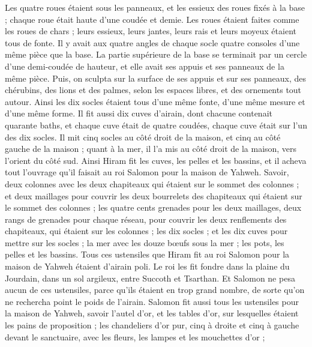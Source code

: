 \begin{multicols}{2}
Les quatre roues étaient sous les panneaux, et les essieux des roues fixés à la base ; chaque roue était haute d'une coudée et demie.
Les roues étaient faites comme les roues de chars ; leurs essieux, leurs jantes, leurs rais et leurs moyeux étaient tous de fonte.
Il y avait aux quatre angles de chaque socle quatre consoles d’une même pièce que la base.
La partie supérieure de la base se terminait par un cercle d’une demi-coudée de hauteur, et elle avait ses appuis et ses panneaux de la même pièce.
Puis, on sculpta sur la surface de ses appuis et sur ses panneaux, des chérubins, des lions et des palmes, selon les espaces libres, et des ornements tout autour.
Ainsi les dix socles étaient tous d’une même fonte, d’une même mesure et d’une même forme.
Il fit aussi dix cuves d'airain, dont chacune contenait quarante baths, et chaque cuve était de quatre coudées, chaque cuve était sur l’un des dix socles.
Il mit cinq socles au côté droit de la maison, et cinq au côté gauche de la maison ; quant à la mer, il l’a mis au côté droit de la maison, vers l'orient du côté sud.
Ainsi Hiram fit les cuves, les pelles et les bassins, et il acheva tout l'ouvrage qu'il faisait au roi Salomon pour la maison de Yahweh.
Savoir, deux colonnes avec les deux chapiteaux qui étaient sur le sommet des colonnes ; et deux maillages pour couvrir les deux bourrelets des chapiteaux qui étaient sur le sommet des colonnes ;
les quatre cents grenades pour les deux maillages, deux rangs de grenades pour chaque réseau, pour couvrir les deux renflements des chapiteaux, qui étaient sur les colonnes ;
les dix socles ; et les dix cuves pour mettre sur les socles ;
la mer avec les douze bœufs sous la mer ;
les pots, les pelles et les bassins. Tous ces ustensiles que Hiram fit au roi Salomon pour la maison de Yahweh étaient d'airain poli.
Le roi les fit fondre dans la plaine du Jourdain, dans un sol argileux, entre Succoth et Tsarthan.
Et Salomon ne pesa aucun de ces ustensiles, parce qu'ils étaient en trop grand nombre, de sorte qu'on ne rechercha point le poids de l’airain.
Salomon fit aussi tous les ustensiles pour la maison de Yahweh, savoir l'autel d'or, et les tables d'or, sur lesquelles étaient les pains de proposition ;
les chandeliers d’or pur, cinq à droite et cinq à gauche devant le sanctuaire, avec les fleurs, les lampes et les mouchettes d'or ;

\end{multicols}
